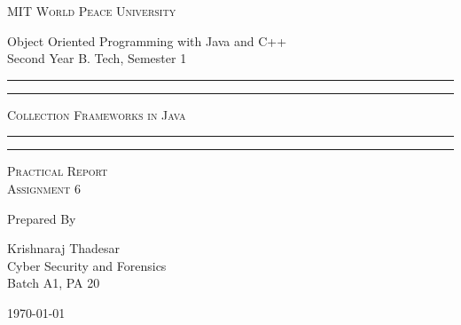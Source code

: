 \documentclass[11pt]{article}
\begin{document}
\begin{titlepage}
	\centering


	\huge\textsc{
		MIT World Peace University
	}\\

	\vspace{0.75\baselineskip} %

	\LARGE{
		Object Oriented Programming with Java and C++\\
		Second Year B. Tech, Semester 1
	}

	\vfill %


	\rule{\textwidth}{1.6pt}\vspace*{-\baselineskip}\vspace*{2pt}
	\rule{\textwidth}{0.6pt}
	\vspace{0.75\baselineskip} %



	\huge{\textsc{
		Collection Frameworks in Java
		}} \\



	\vspace{0.5\baselineskip} %
	\rule{\textwidth}{0.6pt}\vspace*{-\baselineskip}\vspace*{2.8pt}
	\rule{\textwidth}{1.6pt}

	\vspace{1\baselineskip} %


	\LARGE\textsc{
		Practical Report\\
		Assignment 6
	} %
	\vfill


	Prepared By
	\vspace{0.5\baselineskip} %

	\Large{
		Krishnaraj Thadesar \\
		Cyber Security and Forensics\\
		Batch A1, PA 20
	}


	\vspace{0.5\baselineskip} %
	\today

\end{titlepage}
\end{document}
